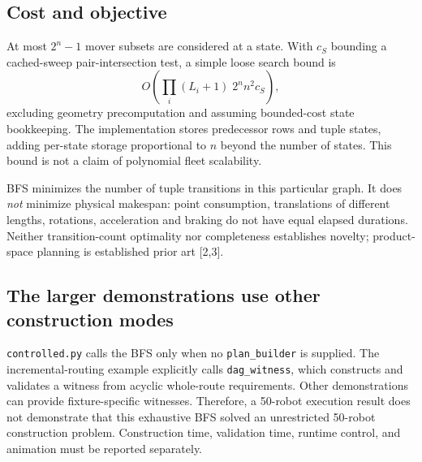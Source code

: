 \documentclass[11pt,a4paper]{article}
\begin{document}
\subsection{Cost and objective}
At most $2^n-1$ mover subsets are considered at a state. With $c_S$ bounding a
cached-sweep pair-intersection test, a simple loose search bound is
\begin{equation}
O\!\left(\prod_i(L_i+1)\;2^n n^2c_S\right),
\end{equation}
excluding geometry precomputation and assuming bounded-cost state bookkeeping.
The implementation stores predecessor rows and tuple states, adding per-state
storage proportional to $n$ beyond the number of states. This bound is not a
claim of polynomial fleet scalability.

BFS minimizes the number of tuple transitions in this particular graph. It does
\emph{not} minimize physical makespan: point consumption, translations of
different lengths, rotations, acceleration and braking do not have equal elapsed
durations. Neither transition-count optimality nor completeness establishes
novelty; product-space planning is established prior art [2,3].

\subsection{The larger demonstrations use other construction modes}
\texttt{controlled.py} calls the BFS only when no \texttt{plan\_builder} is supplied.
The incremental-routing example explicitly calls \texttt{dag\_witness}, which
constructs and validates a witness from acyclic whole-route requirements. Other
demonstrations can provide fixture-specific witnesses. Therefore, a 50-robot
execution result does not demonstrate that this exhaustive BFS solved an
unrestricted 50-robot construction problem. Construction time, validation time,
runtime control, and animation must be reported separately.

\clearpage
\end{document}
